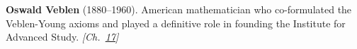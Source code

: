 \textbf{Oswald Veblen} (1880–1960). American mathematician who co-formulated the Veblen-Young axioms and played a definitive role in founding the Institute for Advanced Study. \emph{[Ch.~\hyperref[ch:bignumbers]{17}]}

